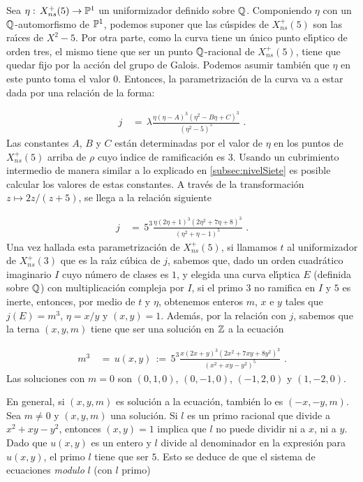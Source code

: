 Sea $\eta:\,X_{ns}^{+}(5)\rightarrow\mathbb{P}^{1}$ un uniformizador definido
sobre $\mathbb{Q}$. Componiendo $\eta$ con un $\mathbb{Q}$-automorfismo de
$\mathbb{P}^{1}$, podemos suponer que las c\'{u}spides de $X_{ns}^{+}(5)$ son
las ra\'{\i}ces de $X^{2}-5$. Por otra parte, como la curva tiene un
\'{u}nico punto el\'{\i}ptico de orden tres, el mismo tiene que ser un punto
$\mathbb{Q}$-racional de $X_{ns}^{+}(5)$, tiene que quedar fijo por la
acci\'{o}n del grupo de Galois. Podemos asumir tambi\'{e}n que
$\eta$ en este punto toma el valor $0$.
Entonces, la parametrizaci\'{o}n de la curva va a estar dada por una
relaci\'{o}n de la forma:

\begin{align*}
j & \,=\,\lambda
\frac{\eta(\eta-A)^{3}(\eta^{2}-B\eta+C)^{3}}{(\eta^{2}-5)^{5}}\text{ .}
\end{align*}
Las constantes $A$, $B$ y $C$ est\'{a}n determinadas por el valor de $\eta$
en los puntos de $X_{ns}^{+}(5)$ arriba de $\rho$ cuyo \'{\i}ndice de
ramificaci\'{o}n es $3$. Usando un cubrimiento intermedio de manera
similar a lo explicado en \ref{subsec:nivelSiete} es posible calcular los
valores de estas constantes. A trav\'{e}s de la transformaci\'{o}n
$z\mapsto 2z/(z+5)$, se llega a la relaci\'{o}n siguiente \cite{chenLevelFive}

\begin{align*}
j & \,=\,5^{3}
\frac{\eta(2\eta+1)^{3}(2\eta^{2}+7\eta+8)^{3}}{(\eta^{2}+\eta-1)^{5}}
\text{ .}
\end{align*}
%
Una vez hallada esta parametrizaci\'{o}n de $X_{ns}^{+}(5)$, si llamamos
$t$ al uniformizador de $X_{ns}^{+}(3)$ que es la ra\'{\i}z c\'{u}bica
de $j$, sabemos que, dado un orden cuadr\'{a}tico imaginario $I$
cuyo n\'{u}mero de clases es $1$, y elegida una curva el\'{\i}ptica $E$
(definida sobre $\mathbb{Q}$) con multiplicaci\'{o}n compleja por $I$,
si el primo $3$ no ramifica en $I$ y $5$ es inerte, entonces, por medio
de $t$ y $\eta$, obtenemos enteros $m$, $x$ e $y$ tales que
$j(E)=m^{3}$, $\eta=x/y$ y $(x,y)=1$. Adem\'{a}s, por la relaci\'{o}n
con $j$, sabemos que la terna $(x,y,m)$ tiene que ser una soluci\'{o}n
en $\mathbb{Z}$ a la ecuaci\'{o}n

\begin{align*}
m^{3} & \,=\,u(x,y)\,:=\,5^{3}
\frac{x(2x+y)^{3}(2x^{2}+7xy+8y^{2})^{3}}{(x^{2}+xy-y^{2})^{5}}
\text{ .}
\end{align*}
Las soluciones con $m=0$ son $(0,1,0)$, $(0,-1,0)$, $(-1,2,0)$ y
$(1,-2,0)$. 

En general, si $(x,y,m)$ es soluci\'{o}n a la ecuaci\'{o}n, tambi\'{e}n
lo es $(-x,-y,m)$. Sea $m\not =0$ y $(x,y,m)$ una
soluci\'{o}n. Si $l$ es un primo racional que divide a $x^{2}+xy-y^{2}$,
entonces $(x,y)=1$ implica que $l$ no puede dividir ni a $x$, ni a $y$.
Dado que $u(x,y)$ es un entero y $l$ divide al denominador en la
expresi\'{o}n para $u(x,y)$, el primo $l$ tiene que ser $5$. Esto se
deduce de que el sistema de ecuaciones \textit{modulo} $l$ (con $l$
primo)

